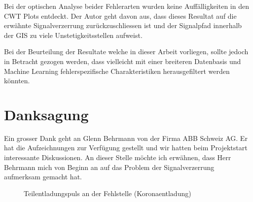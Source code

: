 \begin{refsection}
Bei der optischen Analyse beider Fehlerarten wurden keine Auffälligkeiten in den CWT Plots entdeckt. 
Der Autor geht davon aus, dass dieses Resultat auf die erwähnte Signalverzerrung zurückzuschliessen ist und der Signalpfad innerhalb der GIS zu viele Unstetigkeitsstellen aufweist.

Bei der Beurteilung der Resultate welche in dieser Arbeit vorliegen, sollte jedoch in Betracht gezogen werden, dass vielleicht mit einer breiteren Datenbasis und Machine Learning fehlerspezifische Charakteristiken herausgefiltert werden könnten. 

\section{Danksagung}
Ein grosser Dank geht an Glenn Behrmann von der Firma ABB Schweiz AG. 
Er hat die Aufzeichnungen zur Verfügung gestellt und wir hatten beim Projektstart interessante Diskussionen. An dieser Stelle möchte ich erwähnen, dass Herr Behrmann mich von Beginn an auf das Problem der Signalverzerrung aufmerksam gemacht hat.

\begin{figure}
	\centering
    \caption{Teilentladungspuls an der Fehlstelle (Koronaentladung) \cite{skript:Judd24ps}}
	\label{fig:Teilentaldungspuls}
\end{figure}

\printbibliography[heading=subbibliography]
\end{refsection}
